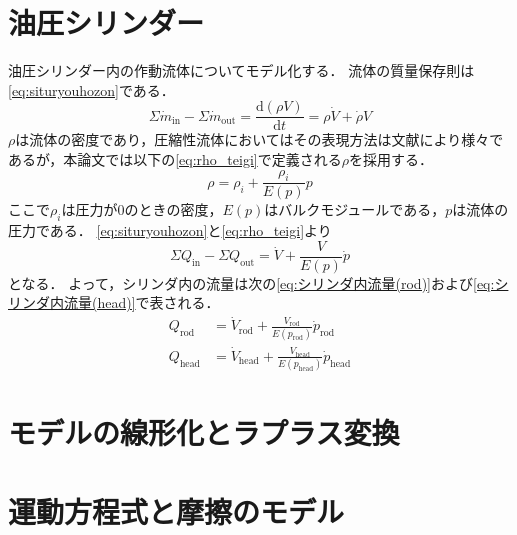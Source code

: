 \section{油圧シリンダー}
油圧シリンダー内の作動流体についてモデル化する．
流体の質量保存則は\eqnname\ref{eq:situryouhozon}である．
\begin{equation}
    \label{eq:situryouhozon}
\Sigma \dot{m}_{\mathrm{in}}-\Sigma \dot{m}_{\mathrm{out}} = \frac{\mathrm{d}(\rho V)}{\mathrm{d}t} = \rho \dot{V}+\dot{\rho}V
\end{equation}
$\rho$は流体の密度であり，圧縮性流体においてはその表現方法は文献により様々であるが，本論文では以下の\eqnname\ref{eq:rho_teigi}で定義される$\rho$を採用する．
\begin{equation}
    \label{eq:rho_teigi}
    \rho = \rho_i + \frac{\rho_i}{E(p)}p
\end{equation}
ここで$\rho_i$は圧力が0のときの密度，$E(p)$はバルクモジュールである，$p$は流体の圧力である．
\eqnname\ref{eq:situryouhozon}と\eqnname\ref{eq:rho_teigi}より
\begin{equation}
    \label{eq:流量保存}
    \Sigma Q_{\mathrm{in}} - \Sigma Q_{\mathrm{out}} = \dot{V} + \frac{V}{E(p)}\dot{p}
\end{equation}
となる．
よって，シリンダ内の流量は次の\eqnname\ref{eq:シリンダ内流量(rod)}および\eqnname\ref{eq:シリンダ内流量(head)}で表される．
\begin{align}
    \label{eq:シリンダ内流量(rod)}
    Q_{\mathrm{rod}}& = \dot{V}_\mathrm{rod} + \frac{V_\mathrm{rod}}{E(p_\mathrm{rod})}\dot{p}_\mathrm{rod}\\
    \label{eq:シリンダ内流量(head)}
    Q_{\mathrm{head}} &= \dot{V}_\mathrm{head} + \frac{V_\mathrm{head}}{E(p_\mathrm{head})}\dot{p}_\mathrm{head}
\end{align}
\section{モデルの線形化とラプラス変換}

\section{運動方程式と摩擦のモデル}
